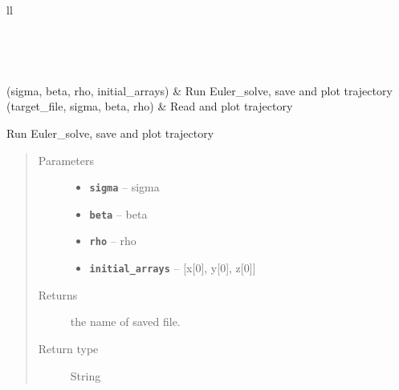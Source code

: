 \documentclass[letterpaper,10pt,english]{sphinxmanual}
\begin{document}
\begin{longtable}{ll}
\hline
\endfirsthead

%
{{}} \\
\hline
\endhead

\hline {} \\ \hline
\endfoot

\endlastfoot


{\hyperref[_autosummary/lorenz:lorenz.run.run_save_plot]{}}(sigma, beta, rho, initial\_arrays)
 & 
Run Euler\_solve, save and plot trajectory
\\
\hline
{\hyperref[_autosummary/lorenz:lorenz.run.run_load_plot]{}}(target\_file, sigma, beta, rho)
 & 
Read and plot trajectory
\\
\hline\end{longtable}


\begin{fulllineitems}
\label{_autosummary/lorenz:lorenz.run.run_save_plot}
Run Euler\_solve, save and plot trajectory
\begin{quote}\begin{description}
\item[{Parameters}] \leavevmode\begin{itemize}
\item {} 
\textbf{\texttt{sigma}} -- sigma

\item {} 
\textbf{\texttt{beta}} -- beta

\item {} 
\textbf{\texttt{rho}} -- rho

\item {} 
\textbf{\texttt{initial\_arrays}} -- {[}x{[}0{]}, y{[}0{]}, z{[}0{]}{]}

\end{itemize}

\item[{Returns}] \leavevmode
the name of saved file.

\item[{Return type}] \leavevmode
String

\end{description}\end{quote}

\end{fulllineitems}
\end{document}
